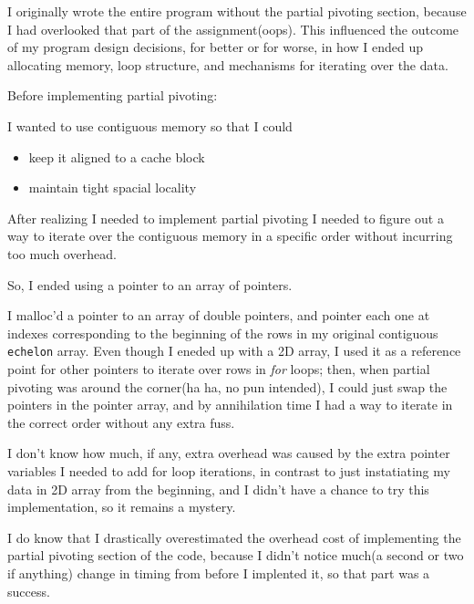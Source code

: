\documentclass[a4paper,12pt]{article}
\begin{document}
    I originally wrote the entire program without the partial pivoting section,
    because I had overlooked that part of the assignment(oops). This influenced
    the outcome of my program design decisions, for better or for worse, in how
    I ended up allocating memory, loop structure, and mechanisms for iterating
    over the data.

    \begin{description}
    \item Before implementing partial pivoting:

        I wanted to use contiguous memory so that I could
        \begin{itemize}
        \item keep it aligned to a cache block
        \item maintain tight spacial locality
        \end{itemize}

    \item After realizing I needed to implement partial pivoting I needed to figure
        out a way to iterate over the contiguous memory in a specific order without
        incurring too much overhead.
        
    \item So, I ended using a pointer to an array of pointers.

        I malloc'd a pointer to an array of double pointers, and pointer
        each one at indexes corresponding to the beginning of the rows in
        my original contiguous \texttt{echelon} array. Even though I eneded up
        with a 2D array, I used it as a reference point for other pointers
        to iterate over rows in \emph{for} loops; then, when partial pivoting
        was around the corner(ha ha, no pun intended), I could just swap the
        pointers in the pointer array, and by annihilation time I had a way
        to iterate in the correct order without any extra fuss.
    \end{description}

    I don't know how much, if any, extra overhead was caused by the extra pointer
    variables I needed to add for loop iterations, in contrast to just instatiating
    my data in 2D array from the beginning, and I didn't have a chance to try
    this implementation, so it remains a mystery.

    I do know that I drastically overestimated the overhead cost of implementing
    the partial pivoting section of the code, because I didn't notice much(a second
    or two if anything) change in timing from before I implented it, so that part
    was a success.
\end{document}
